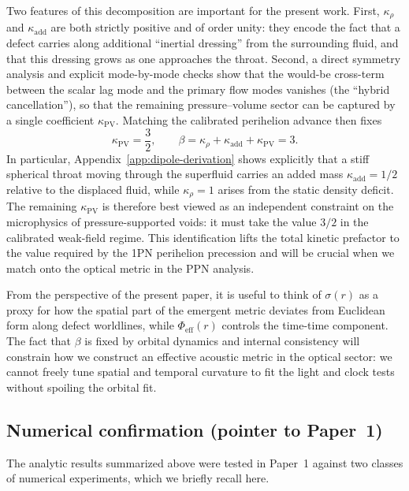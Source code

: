 \documentclass[11pt]{article}
\begin{document}
Two features of this decomposition are important for the present work.
First, $\kappa_\rho$ and $\kappa_{\mathrm{add}}$ are both strictly positive and
of order unity: they encode the fact that a defect carries along additional
``inertial dressing'' from the surrounding fluid, and that this dressing
grows as one approaches the throat.
Second, a direct symmetry analysis and explicit mode-by-mode checks show that
the would-be cross-term between the scalar lag mode and the primary flow modes
vanishes (the ``hybrid cancellation''), so that the remaining pressure--volume
sector can be captured by a single coefficient $\kappa_{\mathrm{PV}}$.
Matching the calibrated perihelion advance then fixes
\begin{equation}
  \kappa_{\mathrm{PV}} = \frac{3}{2},
  \qquad
  \beta = \kappa_\rho + \kappa_{\mathrm{add}} + \kappa_{\mathrm{PV}} = 3.
\end{equation}
In particular, Appendix~\ref{app:dipole-derivation} shows explicitly that
a stiff spherical throat moving through the superfluid carries an added
mass $\kappa_{\mathrm{add}} = 1/2$ relative to the displaced fluid,
while $\kappa_\rho = 1$ arises from the static density deficit.
The remaining $\kappa_{\mathrm{PV}}$ is therefore best viewed as an
independent constraint on the microphysics of pressure-supported voids:
it must take the value $3/2$ in the calibrated weak-field regime.
This identification lifts the total kinetic prefactor to the value required
by the 1PN perihelion precession and will be crucial when we match onto the
optical metric in the PPN analysis.

From the perspective of the present paper, it is useful to think of
$\sigma(r)$ as a proxy for how the spatial part of the emergent metric
deviates from Euclidean form along defect worldlines, while
$\Phi_{\mathrm{eff}}(r)$ controls the time-time component.
The fact that $\beta$ is fixed by orbital dynamics and internal consistency
will constrain how we construct an effective acoustic metric in the optical
sector: we cannot freely tune spatial and temporal curvature to fit the
light and clock tests without spoiling the orbital fit.

\subsection{Numerical confirmation (pointer to Paper~1)}
\label{subsec:paper1-numerics}

The analytic results summarized above were tested in Paper~1 against two
classes of numerical experiments, which we briefly recall here.
\end{document}
